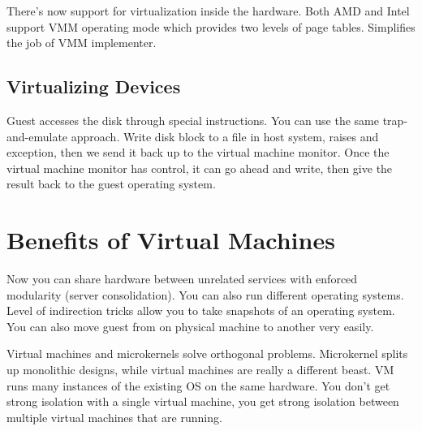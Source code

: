 \documentclass[psamsfonts]{amsart}
\begin{document}
There's now support for virtualization inside the hardware. Both AMD and Intel support VMM operating mode which provides two levels of page tables. Simplifies the job of VMM implementer.

\subsection{Virtualizing Devices}

Guest accesses the disk through special instructions. You can use the same trap-and-emulate approach. Write disk block to a file in host system, raises and exception, then we send it back up to the virtual machine monitor. Once the virtual machine monitor has control, it can go ahead and write, then give the result back to the guest operating system.

\section{Benefits of Virtual Machines}

Now you can share hardware between unrelated services with enforced modularity (server consolidation). You can also run different operating systems. Level of indirection tricks allow you to take snapshots of an operating system. You can also move guest from on physical machine to another very easily.

Virtual machines and microkernels solve orthogonal problems. Microkernel splits up monolithic designs, while virtual machines are really a different beast. VM runs many instances of the existing OS on the same hardware. You don't get strong isolation with a single virtual machine, you get strong isolation between multiple virtual machines that are running.
\end{document}
